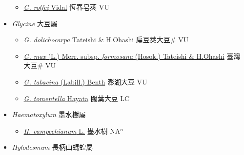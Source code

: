 \begin{itemize}
  \begin{itemize}
        \item[] \href{http://www.theplantlist.org/tpl1.1/search?q=Gleditsia+rolfei}{\textit{G. rolfei} Vidal}   恆春皂莢 VU
  \end{itemize}
 \item[] \textit{Glycine} 大豆屬
                    
  \begin{itemize}
        \item[] \href{http://www.theplantlist.org/tpl1.1/search?q=Glycine+dolichocarpa}{\textit{G. dolichocarpa} Tateishi \& H.Ohashi}   扁豆莢大豆\# VU
        \item[] \href{http://www.theplantlist.org/tpl1.1/search?q=Glycine+max+subsp.+formosana}{\textit{G. max} (L.) Merr. subsp. \textit{formosana} (Hosok.) Tateishi \& H.Ohashi}   臺灣大豆\# VU
        \item[] \href{http://www.theplantlist.org/tpl1.1/search?q=Glycine+tabacina}{\textit{G. tabacina} (Labill.) Benth}   澎湖大豆 VU
        \item[] \href{http://www.theplantlist.org/tpl1.1/search?q=Glycine+tomentella}{\textit{G. tomentella} Hayata}   闊葉大豆 LC
  \end{itemize}
 \item[] \textit{Haematoxylum} 墨水樹屬
                    
  \begin{itemize}
        \item[] \href{http://www.theplantlist.org/tpl1.1/search?q=Haematoxylum+campechianum}{\textit{H. campechianum} L.}   墨水樹 NA$^n$
  \end{itemize}
 \item[] \textit{Hylodesmum} 長柄山螞蝗屬
                    

\end{itemize}
